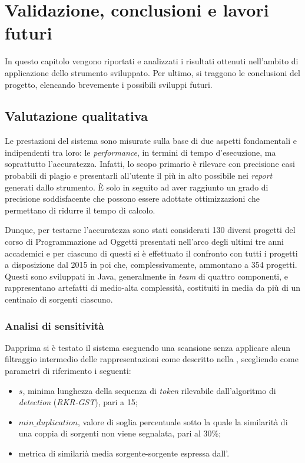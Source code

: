 \chapter{Validazione, conclusioni e lavori futuri}
\label{chapter:validation}
In questo capitolo vengono riportati e analizzati i risultati ottenuti nell'ambito di applicazione dello strumento sviluppato.
%
Per ultimo, si traggono le conclusioni del progetto, elencando brevemente i possibili sviluppi futuri.

\section{Valutazione qualitativa}
Le prestazioni del sistema sono misurate sulla base di due aspetti fondamentali e indipendenti tra loro: le \textit{performance}, in termini di tempo d'esecuzione, ma soprattutto l'accuratezza.
%
Infatti, lo scopo primario è rilevare con precisione casi probabili di plagio e presentarli all'utente il più in alto possibile nei \textit{report} generati dallo strumento.
%
\`E solo in seguito ad aver raggiunto un grado di precisione soddisfacente che possono essere adottate ottimizzazioni che permettano di ridurre il tempo di calcolo.

Dunque, per testarne l'accuratezza sono stati considerati 130 diversi progetti del corso di Programmazione ad Oggetti presentati nell'arco degli ultimi tre anni accademici e per ciascuno di questi si è effettuato il confronto con tutti i progetti a disposizione dal 2015 in poi che, complessivamente, ammontano a 354 progetti.
%
Questi sono sviluppati in Java, generalmente in \textit{team} di quattro componenti, e rappresentano artefatti di medio-alta complessità, costituiti in media da più di un centinaio di sorgenti ciascuno.

\subsection{Analisi di sensitività}
Dapprima si è testato il sistema eseguendo una scansione senza applicare alcun filtraggio intermedio delle rappresentazioni come descritto nella , scegliendo come parametri di riferimento i seguenti:
\begin{itemize}
    \item $s$, minima lunghezza della sequenza di \textit{token} rilevabile dall'algoritmo di \textit{detection} (\textit{RKR-GST}), pari a 15;
    \item $min\_duplication$, valore di soglia percentuale sotto la quale la similarità di una coppia di sorgenti non viene segnalata, pari al 30\%;
    \item metrica di similarià media sorgente-sorgente espressa dall'.
\end{itemize}


